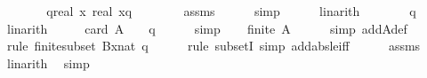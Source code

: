 \begin{isabellebody}
\ \ \isamarkupfalse%
\ \isamarkupfalse%
\ {\isachardoublequoteopen}{\isachardot}{\kern0pt}{\isachardot}{\kern0pt}{\isachardot}{\kern0pt}\ {\isasymle}\ {\isasymlfloor}q{\isacharplus}{\kern0pt}real\ x{\isasymrfloor}{\isacharplus}{\kern0pt}{}\ {\isacharminus}{\kern0pt}{\isasymlceil}real\ x{\isacharminus}{\kern0pt}q{\isasymrceil}\ {\isacharminus}{\kern0pt}\ {}{\isachardoublequoteclose}\isanewline
\ \ \ \ \isamarkupfalse%
\ assms\isanewline
\ \ \ \ \isamarkupfalse%
\ simp\isanewline
\ \ \ \ \isamarkupfalse%
\ linarith\isanewline
\ \ \isamarkupfalse%
\ \isamarkupfalse%
\ {\isachardoublequoteopen}{\isachardot}{\kern0pt}{\isachardot}{\kern0pt}{\isachardot}{\kern0pt}\ {\isasymle}\ {}{\isacharasterisk}{\kern0pt}q{\isachardoublequoteclose}\isanewline
\ \ \ \ \isamarkupfalse%
\ linarith\isanewline
\ \ \isamarkupfalse%
\ \isamarkupfalse%
\ {\isachardoublequoteopen}card\ A\ {\isasymle}\ {}\ {\isacharasterisk}{\kern0pt}\ q{\isachardoublequoteclose}\isanewline
\ \ \ \ \isamarkupfalse%
\ simp\isanewline
\ \ \isamarkupfalse%
\ {\isachardoublequoteopen}finite\ A{\isachardoublequoteclose}\isanewline
\ \ \ \ \isamarkupfalse%
\ {\isacharparenleft}{\kern0pt}simp\ add{\isacharcolon}{\kern0pt}A{\isacharunderscore}{\kern0pt}def{\isacharparenright}{\kern0pt}\isanewline
\ \ \ \ \isamarkupfalse%
\ {\isacharparenleft}{\kern0pt}rule\ finite{\isacharunderscore}{\kern0pt}subset{\isacharbrackleft}{\kern0pt}\ B{\isacharequal}{\kern0pt}{\isachardoublequoteopen}{\isacharbraceleft}{\kern0pt}{}{\isachardot}{\kern0pt}{\isachardot}{\kern0pt}x{\isacharplus}{\kern0pt}nat\ {\isasymlceil}q{\isasymrceil}{\isacharbraceright}{\kern0pt}{\isachardoublequoteclose}{\isacharbrackright}{\kern0pt}{\isacharparenright}{\kern0pt}\isanewline
\ \ \ \ \isamarkupfalse%
\ {\isacharparenleft}{\kern0pt}rule\ subsetI{\isacharcomma}{\kern0pt}\ simp\ add{\isacharcolon}{\kern0pt}abs{\isacharunderscore}{\kern0pt}le{\isacharunderscore}{\kern0pt}iff{\isacharparenright}{\kern0pt}\isanewline
\ \ \ \ \isamarkupfalse%
\ assms\ \isamarkupfalse%
\ linarith\ \isamarkupfalse%
\ simp\isanewline
{}\isamarkupfalse%
%
\endisatagproof
{\isafoldproof}%
%
\isadelimproof
\isanewline
%
\endisadelimproof
\isanewline
{}\isamarkupfalse%

\end{isabellebody}
